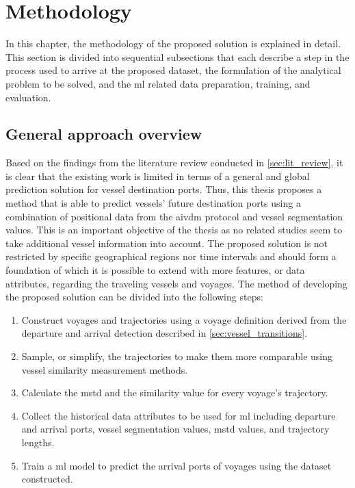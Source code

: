 \chapter{Methodology}
\label{chap:method}

In this chapter, the methodology of the proposed solution is explained in detail. This section is divided into sequential subsections that each describe a step in the process used to arrive at the proposed dataset, the formulation of the analytical problem to be solved, and the \acrfull{ml} related data preparation, training, and evaluation.

\section{General approach overview}

Based on the findings from the literature review conducted in \cref{sec:lit_review}, it is clear that the existing work is limited in terms of a general and global prediction solution for vessel destination ports. Thus, this thesis proposes a method that is able to predict vessels' future destination ports using a combination of positional data from the \gls{aivdm} protocol and vessel segmentation values. This is an important objective of the thesis as no related studies seem to take additional vessel information into account. The proposed solution is not restricted by specific geographical regions nor time intervals and should form a foundation of which it is possible to extend with more features, or data attributes, regarding the traveling vessels and voyages. The method of developing the proposed solution can be divided into the following steps:

\begin{enumerate}
    \item Construct voyages and trajectories using a voyage definition derived from the departure and arrival detection described in \cref{sec:vessel_transitions}.
    \item Sample, or simplify, the trajectories to make them more comparable using vessel similarity measurement methods.
    \item Calculate the \acrfull{mstd} and the similarity value for every voyage's trajectory.
    \item Collect the historical data attributes to be used for \acrfull{ml} including departure and arrival ports, vessel segmentation values, \acrshort{mstd} values, and trajectory lengths.
    \item Train a \acrshort{ml} model to predict the arrival ports of voyages using the dataset constructed.
\end{enumerate}

